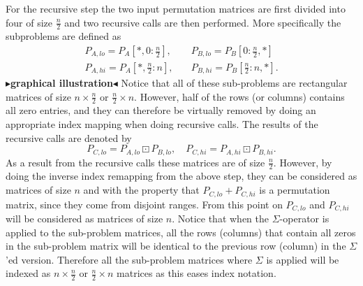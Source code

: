 \documentclass[twoside,11pt,openright]{report}
\newcommand{\todo}[1]{{\color[rgb]{.5,0,0}\textbf{$\blacktriangleright$#1$\blacktriangleleft$}}}
\begin{document}
For the recursive step the two input permutation matrices are first divided into four of size $\frac{n}{2}$ and two recursive calls are then performed. More specifically the subproblems are defined as
\begin{align*}
  P_{A,lo} = P_A\left[*, 0 : \frac{n}{2}\right], \quad &P_{B,lo} = P_B\left[0 : \frac{n}{2}, *\right] \\
  P_{A,hi} = P_A\left[*, \frac{n}{2} : n\right], \quad &P_{B,hi} = P_B\left[\frac{n}{2} : n, *\right].
\end{align*}
\todo{graphical illustration} Notice that all of these sub-problems are rectangular matrices of size $n \times \frac{n}{2}$ or $\frac{n}{2} \times n$. However, half of the rows (or columns) contains all zero entries, and they can therefore be virtually removed by doing an appropriate index mapping when doing recursive calls. The results of the recursive calls are denoted by
\[
  P_{C,lo} = P_{A,lo} \boxdot P_{B,lo}, \quad P_{C,hi} = P_{A,hi} \boxdot P_{B,hi}.
\]
As a result from the recursive calls these matrices are of size $\frac{n}{2}$. However, by doing the inverse index remapping from the above step, they can be considered as matrices of size $n$ and with the property that $P_{C,lo} + P_{C,hi}$ is a permutation matrix, since they come from disjoint ranges. From this point on $P_{C,lo}$ and $P_{C,hi}$ will be considered as matrices of size $n$. Notice that when the $\Sigma$-operator is applied to the sub-problem matrices, all the rows (columns) that contain all zeros in the sub-problem matrix will be identical to the previous row (column) in the $\Sigma$'ed version. Therefore all the sub-problem matrices where $\Sigma$ is applied will be indexed as $n \times \frac{n}{2}$ or $\frac{n}{2} \times n$ matrices as this eases index notation.
\end{document}
